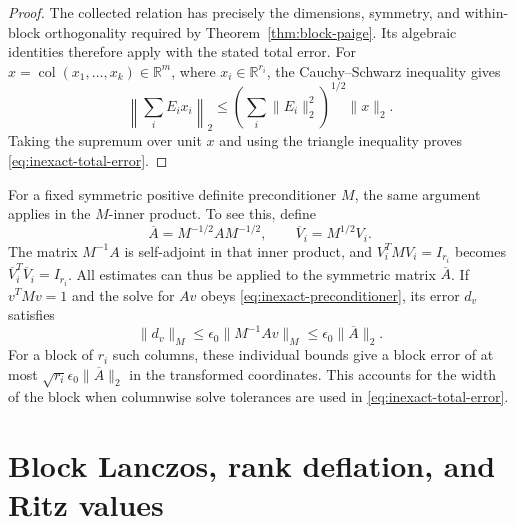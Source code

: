 \documentclass[11pt]{article}
\theoremstyle{definition}
\newcommand{\R}{\mathbb{R}}
\begin{document}
\begin{proof}
The collected relation has precisely the dimensions, symmetry, and
within-block orthogonality required by Theorem~\ref{thm:block-paige}.
Its algebraic identities therefore apply with the stated total error.
For $x=\operatorname{col}(x_1,\ldots,x_k)\in\R^m$, where
$x_i\in\R^{r_i}$, the Cauchy--Schwarz inequality gives
\[
 \left\|\sum_i E_i x_i\right\|_2
 \le\left(\sum_i\|E_i\|_2^2\right)^{1/2}\|x\|_2.
\]
Taking the supremum over unit $x$ and using the triangle inequality proves
\eqref{eq:inexact-total-error}.
\end{proof}

For a fixed symmetric positive definite preconditioner $M$, the same
argument applies in the $M$-inner product. To see this, define
\[
 \overline A=M^{-1/2}AM^{-1/2},\qquad
 \overline V_i=M^{1/2}V_i.
\]
The matrix $M^{-1}A$ is self-adjoint in that inner product, and
$V_i^TMV_i=I_{r_i}$ becomes $\overline V_i^T\overline V_i=I_{r_i}$.
All estimates can thus be applied to the symmetric matrix $\overline A$.
If $v^TMv=1$ and the solve for $Av$ obeys
\eqref{eq:inexact-preconditioner}, its error $d_v$ satisfies
\[
 \|d_v\|_M\le\epsilon_0\|M^{-1}Av\|_M
 \le\epsilon_0\|\overline A\|_2.
\]
For a block of $r_i$ such columns, these individual bounds give a block
error of at most $\sqrt{r_i}\epsilon_0\|\overline A\|_2$ in the
transformed coordinates. This accounts for the width of the block when
columnwise solve tolerances are used in \eqref{eq:inexact-total-error}.
\section{Block Lanczos, rank deflation, and Ritz values}
\end{document}
